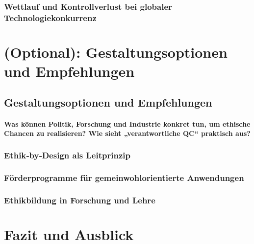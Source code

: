 \subsubsection{Wettlauf und Kontrollverlust bei globaler Technologiekonkurrenz}

\section{(Optional): Gestaltungsoptionen und Empfehlungen}

\subsection{Gestaltungsoptionen und Empfehlungen}
\paragraph{Was können Politik, Forschung und Industrie konkret tun, um ethische Chancen zu realisieren? 
Wie sieht „verantwortliche QC“ praktisch aus?}

\subsubsection{Ethik‑by‑Design als Leitprinzip}
\subsubsection{Förderprogramme für gemeinwohlorientierte Anwendungen}
\subsubsection{Ethikbildung in Forschung und Lehre}

\section{Fazit und Ausblick}
\paragraph{}







\printbibliography








